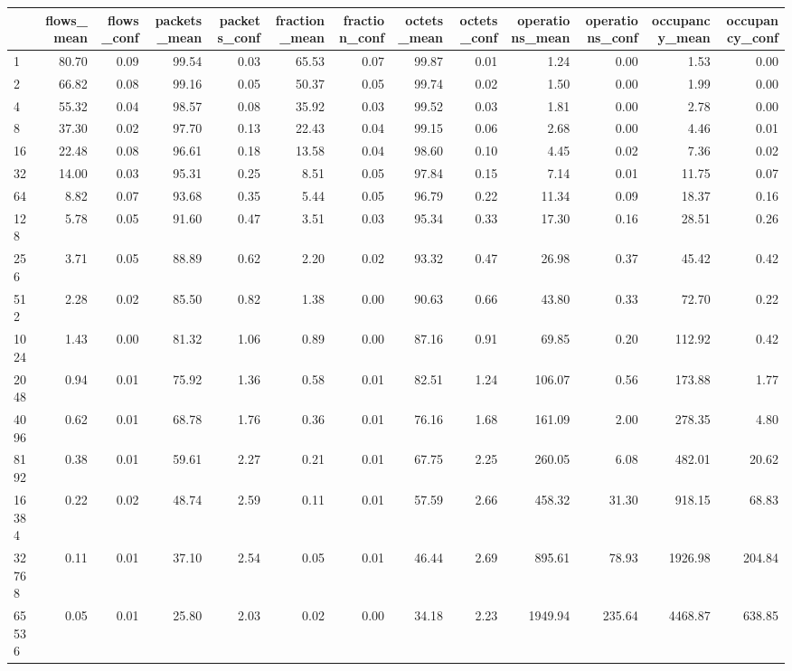 \begin{tabular}{lrrrrrrrrrrrr}
\toprule
 & flows_mean & flows_conf & packets_mean & packets_conf & fraction_mean & fraction_conf & octets_mean & octets_conf & operations_mean & operations_conf & occupancy_mean & occupancy_conf \\
\midrule
1 & 80.70 & 0.09 & 99.54 & 0.03 & 65.53 & 0.07 & 99.87 & 0.01 & 1.24 & 0.00 & 1.53 & 0.00 \\
2 & 66.82 & 0.08 & 99.16 & 0.05 & 50.37 & 0.05 & 99.74 & 0.02 & 1.50 & 0.00 & 1.99 & 0.00 \\
4 & 55.32 & 0.04 & 98.57 & 0.08 & 35.92 & 0.03 & 99.52 & 0.03 & 1.81 & 0.00 & 2.78 & 0.00 \\
8 & 37.30 & 0.02 & 97.70 & 0.13 & 22.43 & 0.04 & 99.15 & 0.06 & 2.68 & 0.00 & 4.46 & 0.01 \\
16 & 22.48 & 0.08 & 96.61 & 0.18 & 13.58 & 0.04 & 98.60 & 0.10 & 4.45 & 0.02 & 7.36 & 0.02 \\
32 & 14.00 & 0.03 & 95.31 & 0.25 & 8.51 & 0.05 & 97.84 & 0.15 & 7.14 & 0.01 & 11.75 & 0.07 \\
64 & 8.82 & 0.07 & 93.68 & 0.35 & 5.44 & 0.05 & 96.79 & 0.22 & 11.34 & 0.09 & 18.37 & 0.16 \\
128 & 5.78 & 0.05 & 91.60 & 0.47 & 3.51 & 0.03 & 95.34 & 0.33 & 17.30 & 0.16 & 28.51 & 0.26 \\
256 & 3.71 & 0.05 & 88.89 & 0.62 & 2.20 & 0.02 & 93.32 & 0.47 & 26.98 & 0.37 & 45.42 & 0.42 \\
512 & 2.28 & 0.02 & 85.50 & 0.82 & 1.38 & 0.00 & 90.63 & 0.66 & 43.80 & 0.33 & 72.70 & 0.22 \\
1024 & 1.43 & 0.00 & 81.32 & 1.06 & 0.89 & 0.00 & 87.16 & 0.91 & 69.85 & 0.20 & 112.92 & 0.42 \\
2048 & 0.94 & 0.01 & 75.92 & 1.36 & 0.58 & 0.01 & 82.51 & 1.24 & 106.07 & 0.56 & 173.88 & 1.77 \\
4096 & 0.62 & 0.01 & 68.78 & 1.76 & 0.36 & 0.01 & 76.16 & 1.68 & 161.09 & 2.00 & 278.35 & 4.80 \\
8192 & 0.38 & 0.01 & 59.61 & 2.27 & 0.21 & 0.01 & 67.75 & 2.25 & 260.05 & 6.08 & 482.01 & 20.62 \\
16384 & 0.22 & 0.02 & 48.74 & 2.59 & 0.11 & 0.01 & 57.59 & 2.66 & 458.32 & 31.30 & 918.15 & 68.83 \\
32768 & 0.11 & 0.01 & 37.10 & 2.54 & 0.05 & 0.01 & 46.44 & 2.69 & 895.61 & 78.93 & 1926.98 & 204.84 \\
65536 & 0.05 & 0.01 & 25.80 & 2.03 & 0.02 & 0.00 & 34.18 & 2.23 & 1949.94 & 235.64 & 4468.87 & 638.85 \\

\end{tabular}
